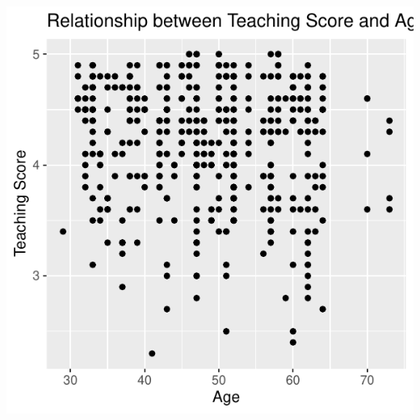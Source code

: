 \documentclass[
  letterpaper,
  DIV=11,
  numbers=noendperiod]{scrartcl}
\begin{document}
\begin{tcolorbox}
\begin{center}
\includegraphics{about_files/figure-pdf/unnamed-chunk-2-1.pdf}
\end{center}

\end{tcolorbox}
\end{document}
